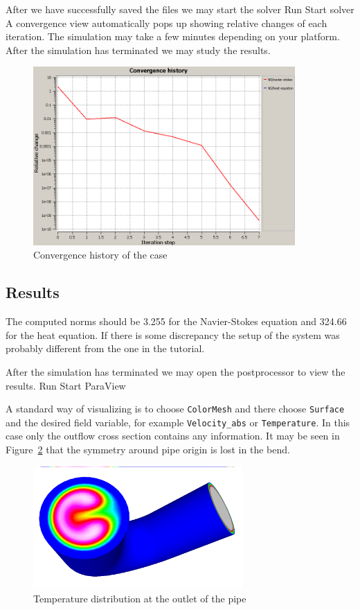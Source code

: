 After we have successfully saved the files we may start the solver
\ttbegin
Run
  Start solver
\ttend
A convergence view automatically pops up showing relative changes of each iteration.
The simulation may take a few minutes depending on your platform. 
After the simulation has terminated we may study the results.
\begin{figure}[h]
\centering
\includegraphics[width=10cm]{curved_pipe_convergence}
\caption{Convergence history of the case}\label{fg:curved_pipe_convergence}
\end{figure} 

\subsection*{Results}

The computed norms should be 3.255 for the Navier-Stokes equation and
324.66 for the heat equation. If there is some discrepancy the setup of the system
was probably different from the one in the tutorial.

After the simulation has terminated we may open the postprocessor to view the results.
\ttbegin
Run
  Start ParaView
\ttend

A standard way of visualizing is to choose \texttt{ColorMesh} and 
there choose \texttt{Surface} and the desired field variable, for example 
\texttt{Velocity\_abs} or \texttt{Temperature}. In this case only the 
outflow cross section contains any information. It may be seen in 
Figure~\ref{fg:curved_pipe_temp_end} that the symmetry around pipe origin is lost in the 
bend. 
\begin{figure}[h]
\centering
\includegraphics[width=8cm, viewport=0 20 1024 580,clip]{curved_pipe_velo_end}
\caption{Temperature distribution at the outlet of the pipe}\label{fg:curved_pipe_temp_end}
\end{figure} 

